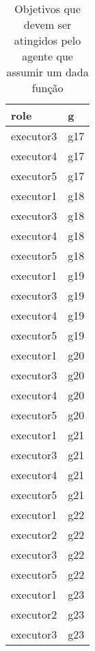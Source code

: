 \begin{table}[H]
\centering
{}
\begin{tabular}{|l|l|}
\hline
\textbf{role} & \textbf{g} \\ \hline
executor3 & g17 \\ \hline
executor4 & g17 \\ \hline
executor5 & g17 \\ \hline
executor1 & g18 \\ \hline
executor3 & g18 \\ \hline
executor4 & g18 \\ \hline
executor5 & g18 \\ \hline
executor1 & g19 \\ \hline
executor3 & g19 \\ \hline
executor4 & g19 \\ \hline
executor5 & g19 \\ \hline
executor1 & g20 \\ \hline
executor3 & g20 \\ \hline
executor4 & g20 \\ \hline
executor5 & g20 \\ \hline
executor1 & g21 \\ \hline
executor3 & g21 \\ \hline
executor4 & g21 \\ \hline
executor5 & g21 \\ \hline
executor1 & g22 \\ \hline
executor2 & g22 \\ \hline
executor3 & g22 \\ \hline
executor5 & g22 \\ \hline
executor1 & g23 \\ \hline
executor2 & g23 \\ \hline
executor3 & g23 \\ \hline
\end{tabular}
\caption{Objetivos que devem ser atingidos pelo agente que assumir um dada função}
\label{deontic3}
\end{table}

